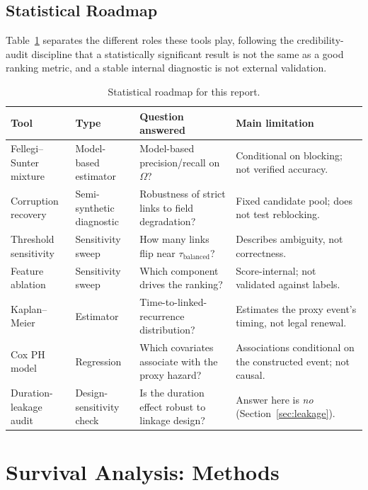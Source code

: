 \documentclass[11pt]{article}
\begin{document}
\subsection{Statistical Roadmap}
Table~\ref{tab:roadmap} separates the different roles these tools play,
following the credibility-audit discipline that a statistically significant
result is not the same as a good ranking metric, and a stable internal
diagnostic is not external validation.

\begin{table}[h!]
\centering
\caption{Statistical roadmap for this report.}
\label{tab:roadmap}
\small
\begin{tabular}{p{}p{}p{}p{}}
\toprule
Tool & Type & Question answered & Main limitation \\
\midrule
Fellegi--Sunter mixture & Model-based estimator & Model-based precision/recall on $\Omega$? & Conditional on blocking; not verified accuracy. \\
Corruption recovery & Semi-synthetic diagnostic & Robustness of strict links to field degradation? & Fixed candidate pool; does not test reblocking. \\
Threshold sensitivity & Sensitivity sweep & How many links flip near $\tau_{\text{balanced}}$? & Describes ambiguity, not correctness. \\
Feature ablation & Sensitivity sweep & Which component drives the ranking? & Score-internal; not validated against labels. \\
Kaplan--Meier & Estimator & Time-to-linked-recurrence distribution? & Estimates the proxy event's timing, not legal renewal. \\
Cox PH model & Regression & Which covariates associate with the proxy hazard? & Associations conditional on the constructed event; not causal. \\
Duration-leakage audit & Design-sensitivity check & Is the duration effect robust to linkage design? & Answer here is \emph{no} (Section~\ref{sec:leakage}). \\
\bottomrule
\end{tabular}
\end{table}

\section{Survival Analysis: Methods}
\label{sec:survival-methods}
\end{document}
